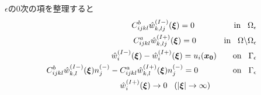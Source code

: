 $\epsilon$の0次の項を整理すると
\begin{align}
	C_{ijkl}^{b} \hat{w}^{(I-)}_{k,lj}(\bm{\xi})=0
	\hspace{1.7cm}\text{in}\hspace{0.3cm}\Omega_{\epsilon}
	\label{eq:GovDisturIn1}
	\\
	C_{ijkl}^{a} \hat{w}^{(I+)}_{k,lj}(\bm{\xi})=0
	\hspace{1.2cm}\text{in}\hspace{0.3cm}\Omega\backslash\Omega_{\epsilon}
	\label{eq:GovDisturOut1}
	\\
	\hat{w}_{i}^{(I-)}(\bm{\xi})-\hat{w}_{i}^{(I+)}(\bm{\xi})=u_{i}(\bm{x_0})
	\hspace{0.7cm}\text{on}\hspace{0.3cm}\Gamma_{\epsilon}
	\label{eq:GovDisturUBC1}
	\\
	C_{ijkl}^{b}\hat{w}_{k,l}^{(I-)}(\bm{\xi})n_{j}^{(-)}
	-C_{ijkl}^{a}\hat{w}_{k,l}^{(I+)}(\bm{\xi})n_{j}^{(-)}=0
	\hspace{1.5cm}\text{on}\hspace{0.3cm}\Gamma_{\epsilon}
	\label{eq:GovDisturSBC1}
	\\
	\hat{w}_{i}^{(I+)}(\bm{\xi})\rightarrow 0\hspace{0.3cm} (|\bm{\xi}|\rightarrow \infty)
	\hspace{2.0cm}
	\label{eq:GovDisturInftyBC1}
\end{align}

